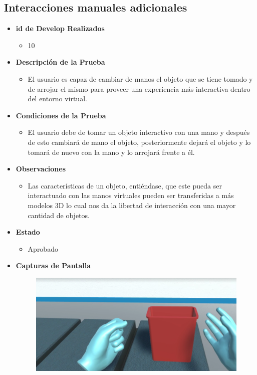 \subsection{Interacciones manuales adicionales}
\begin{itemize}
    \item \textbf{id de Develop Realizados}
    \begin{itemize}
        \item 10
    \end{itemize}
    \item \textbf{Descripción de la Prueba}
    \begin{itemize}
        \item El usuario es capaz de cambiar de manos el objeto que se tiene tomado y de arrojar el mismo para proveer una experiencia más interactiva dentro del entorno virtual.
    \end{itemize}
    \item \textbf{Condiciones de la Prueba}
    \begin{itemize}
        \item El usuario debe de tomar un objeto interactivo con una mano y después de esto cambiará de mano el objeto, posteriormente dejará el objeto y lo tomará de nuevo con la mano y lo arrojará frente a él.
    \end{itemize}
    \item \textbf{Observaciones}
    \begin{itemize}
        \item Las características de un objeto, entiéndase, que este pueda ser interactuado con las manos virtuales pueden ser transferidas a más modelos 3D lo cual nos da la libertad de interacción con una mayor cantidad de objetos.      
    \end{itemize}
    \item \textbf{Estado}
    \begin{itemize}
        \item Aprobado
    \end{itemize}
    \item \textbf{Capturas de Pantalla}
    \begin{figure}[H]
       	\begin{center}
       		\includegraphics[width = .7\textwidth]{source/images/image76.png}

\end{center}
\end{figure}
\end{itemize}
